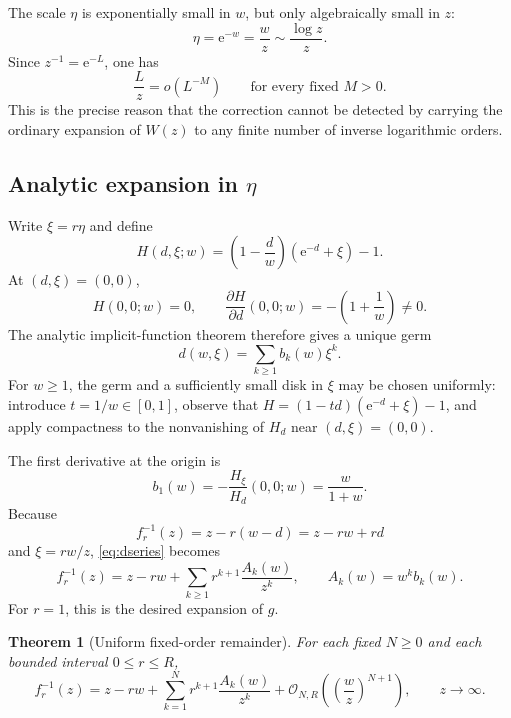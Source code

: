 \documentclass[11pt]{article}
\theoremstyle{clean}
\newtheorem{theorem}{Theorem}[section]
\newcommand{\e}{\mathrm e}
\newcommand{\bigO}{\mathcal O}
\begin{document}
The scale \(\eta\) is exponentially small in \(w\), but only algebraically
small in \(z\):
\begin{equation}\label{eq:etasize}
  \eta=\e^{-w}=\frac{w}{z}\sim\frac{\log z}{z}.
\end{equation}
Since \(z^{-1}=\e^{-L}\), one has
\begin{equation}\label{eq:beyondorders}
  \frac{L}{z}=o(L^{-M})
  \qquad\text{for every fixed }M>0.
\end{equation}
This is the precise reason that the correction cannot be detected by carrying
the ordinary expansion of \(W(z)\) to any finite number of inverse logarithmic
orders.

\subsection{Analytic expansion in \texorpdfstring{\(\eta\)}{eta}}

Write \(\xi=r\eta\) and define
\[
  H(d,\xi;w)=\left(1-\frac{d}{w}\right)(\e^{-d}+\xi)-1.
\]
At \((d,\xi)=(0,0)\),
\[
  H(0,0;w)=0,
  \qquad
  \frac{\partial H}{\partial d}(0,0;w)=-\left(1+\frac1w\right)\ne0.
\]
The analytic implicit-function theorem therefore gives a unique germ
\begin{equation}\label{eq:dseries}
  d(w,\xi)=\sum_{k\ge1}b_k(w)\xi^k.
\end{equation}
For \(w\ge1\), the germ and a sufficiently small disk in \(\xi\) may be
chosen uniformly: introduce \(t=1/w\in[0,1]\), observe that
\(H=(1-td)(\e^{-d}+\xi)-1\), and apply compactness to the nonvanishing
of \(H_d\) near \((d,\xi)=(0,0)\).

The first derivative at the origin is
\begin{equation}\label{eq:b1}
  b_1(w)=-\frac{H_\xi}{H_d}(0,0;w)=\frac{w}{1+w}.
\end{equation}
Because
\[
  f_r^{-1}(z)=z-r(w-d)=z-rw+r d
\]
and \(\xi=r w/z\), \cref{eq:dseries} becomes
\begin{equation}\label{eq:grA}
  f_r^{-1}(z)
  =z-rw+\sum_{k\ge1}r^{k+1}\frac{A_k(w)}{z^k},
  \qquad
  A_k(w)=w^k b_k(w).
\end{equation}
For \(r=1\), this is the desired expansion of \(g\).

\begin{theorem}[Uniform fixed-order remainder]\label{thm:uniformremainder}
For each fixed \(N\ge0\) and each bounded interval \(0\le r\le R\),
\begin{equation}\label{eq:generalremainder}
  f_r^{-1}(z)=z-rw+
  \sum_{k=1}^{N}r^{k+1}\frac{A_k(w)}{z^k}
  +\bigO_{N,R}\!\left(\left(\frac{w}{z}\right)^{N+1}\right),
  \qquad z\to\infty.
\end{equation}
\end{theorem}
\end{document}
